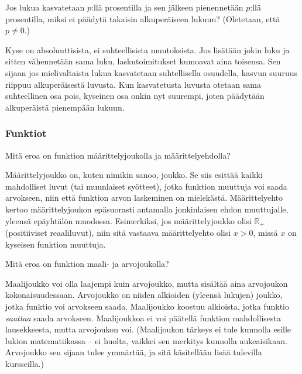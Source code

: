 \begin{tehtava}
Jos lukua kasvatetaan $p$:llä prosentilla ja sen jälkeen pienennetään $p$:llä prosentilla, miksi ei päädytä takaisin alkuperäiseen lukuun? (Oletetaan, että $p\neq 0$.)
	\begin{vastaus}
	Kyse on absoluuttisista, ei suhteellisista muutoksista. Jos lisätään jokin luku ja sitten vähennetään sama luku, laskutoimitukset kumoavat aina toisensa. Sen sijaan jos mielivaltaista lukua kasvatetaan suhtellisella osuudella, kasvun suuruus riippuu alkuperäisestä luvusta. Kun kasvatetusta luvusta otetaan sama suhteellinen osa pois, kyseinen osa onkin nyt suurempi, joten päädytään alkuperäistä pienempään lukuun.
	\end{vastaus}
\end{tehtava}

\subsubsection*{Funktiot}

\begin{tehtava}
Mitä eroa on funktion määrittelyjoukolla ja määrittelyehdolla?
\begin{vastaus}
Määrittelyjoukko on, kuten nimikin sanoo, joukko. Se siis esittää kaikki mahdolliset luvut (tai muunlaiset syötteet), jotka funktion muuttuja voi saada arvokseen, niin että funktion arvon laskeminen on mielekästä. Määrittelyehto kertoo määrittelyjoukon epäsuorasti antamalla jonkinlaisen ehdon muuttujalle, yleensä epäyhtälön muodossa. Esimerkiksi, jos määrittelyjoukko olisi $\mathbb{R}_+$ (positiiviset reaaliluvut), niin sitä vastaava määrittelyehto olisi $x>0$, missä $x$ on kyseisen funktion muuttuja.
\end{vastaus}
\end{tehtava}

\begin{tehtava}
Mitä eroa on funktion maali- ja arvojoukolla?
	\begin{vastaus}
Maalijoukko voi olla laajempi kuin arvojoukko, mutta sisältää aina arvojoukon kokonaisuudessaan. Arvojoukko on niiden alkioiden (yleensä lukujen) joukko, jotka funktio voi arvokseen saada. Maalijoukko koostuu alkioista, jotka funktio \textit{saattaa} saada arvokseen. Maalijoukkoa ei voi päätellä funktion mahdollisesta lausekkeesta, mutta arvojoukon voi. (Maalijoukon tärkeys ei tule kunnolla esille lukion matematiikassa -- ei huolta, vaikkei sen merkitys kunnolla aukeaisikaan. Arvojoukko sen sijaan tulee ymmärtää, ja sitä käsitellään lisää tulevilla kursseilla.)
	\end{vastaus}
\end{tehtava}



